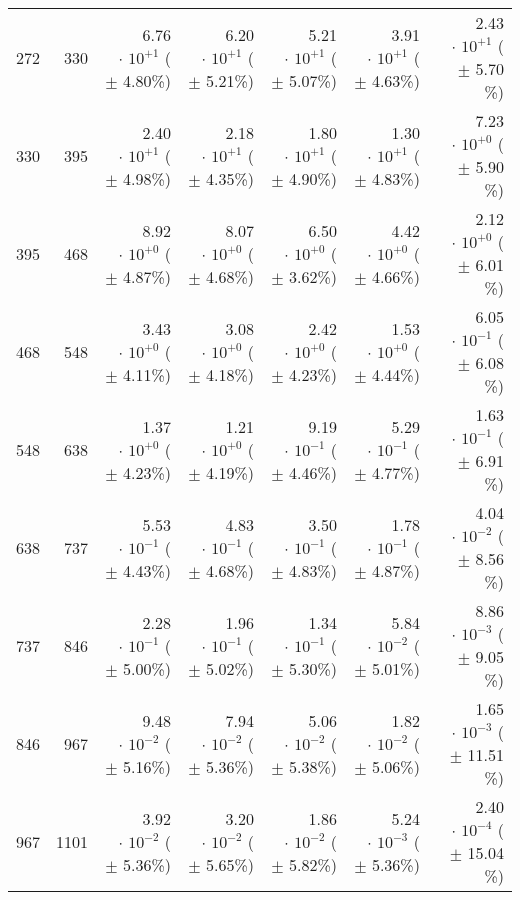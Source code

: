\begin{table}[h!]
\begin{center}
\begin{tabular}{|r|r|r|r|r|r|r|}
 272 &  330 & 6.76$\,\cdot\, 10^{+1}$  ($\pm\!\!$  4.80\%) & 6.20$\,\cdot\, 10^{+1}$  ($\pm\!\!$  5.21\%) & 5.21$\,\cdot\, 10^{+1}$  ($\pm\!\!$  5.07\%) & 3.91$\,\cdot\, 10^{+1}$  ($\pm\!\!$  4.63\%) & 2.43$\,\cdot\, 10^{+1}$  ($\pm\!\!$  5.70 \%)\\
 330 &  395 & 2.40$\,\cdot\, 10^{+1}$  ($\pm\!\!$  4.98\%) & 2.18$\,\cdot\, 10^{+1}$  ($\pm\!\!$  4.35\%) & 1.80$\,\cdot\, 10^{+1}$  ($\pm\!\!$  4.90\%) & 1.30$\,\cdot\, 10^{+1}$  ($\pm\!\!$  4.83\%) & 7.23$\,\cdot\, 10^{+0}$  ($\pm\!\!$  5.90 \%)\\
 395 &  468 & 8.92$\,\cdot\, 10^{+0}$  ($\pm\!\!$  4.87\%) & 8.07$\,\cdot\, 10^{+0}$  ($\pm\!\!$  4.68\%) & 6.50$\,\cdot\, 10^{+0}$  ($\pm\!\!$  3.62\%) & 4.42$\,\cdot\, 10^{+0}$  ($\pm\!\!$  4.66\%) & 2.12$\,\cdot\, 10^{+0}$  ($\pm\!\!$  6.01 \%)\\
 468 &  548 & 3.43$\,\cdot\, 10^{+0}$  ($\pm\!\!$  4.11\%) & 3.08$\,\cdot\, 10^{+0}$  ($\pm\!\!$  4.18\%) & 2.42$\,\cdot\, 10^{+0}$  ($\pm\!\!$  4.23\%) & 1.53$\,\cdot\, 10^{+0}$  ($\pm\!\!$  4.44\%) & 6.05$\,\cdot\, 10^{-1}$  ($\pm\!\!$  6.08 \%)\\
 548 &  638 & 1.37$\,\cdot\, 10^{+0}$  ($\pm\!\!$  4.23\%) & 1.21$\,\cdot\, 10^{+0}$  ($\pm\!\!$  4.19\%) & 9.19$\,\cdot\, 10^{-1}$  ($\pm\!\!$  4.46\%) & 5.29$\,\cdot\, 10^{-1}$  ($\pm\!\!$  4.77\%) & 1.63$\,\cdot\, 10^{-1}$  ($\pm\!\!$  6.91 \%)\\
 638 &  737 & 5.53$\,\cdot\, 10^{-1}$  ($\pm\!\!$  4.43\%) & 4.83$\,\cdot\, 10^{-1}$  ($\pm\!\!$  4.68\%) & 3.50$\,\cdot\, 10^{-1}$  ($\pm\!\!$  4.83\%) & 1.78$\,\cdot\, 10^{-1}$  ($\pm\!\!$  4.87\%) & 4.04$\,\cdot\, 10^{-2}$  ($\pm\!\!$  8.56 \%)\\
 737 &  846 & 2.28$\,\cdot\, 10^{-1}$  ($\pm\!\!$  5.00\%) & 1.96$\,\cdot\, 10^{-1}$  ($\pm\!\!$  5.02\%) & 1.34$\,\cdot\, 10^{-1}$  ($\pm\!\!$  5.30\%) & 5.84$\,\cdot\, 10^{-2}$  ($\pm\!\!$  5.01\%) & 8.86$\,\cdot\, 10^{-3}$  ($\pm\!\!$  9.05 \%)\\
 846 &  967 & 9.48$\,\cdot\, 10^{-2}$  ($\pm\!\!$  5.16\%) & 7.94$\,\cdot\, 10^{-2}$  ($\pm\!\!$  5.36\%) & 5.06$\,\cdot\, 10^{-2}$  ($\pm\!\!$  5.38\%) & 1.82$\,\cdot\, 10^{-2}$  ($\pm\!\!$  5.06\%) & 1.65$\,\cdot\, 10^{-3}$  ($\pm\!\!$ 11.51 \%)\\
 967 & 1101 & 3.92$\,\cdot\, 10^{-2}$  ($\pm\!\!$  5.36\%) & 3.20$\,\cdot\, 10^{-2}$  ($\pm\!\!$  5.65\%) & 1.86$\,\cdot\, 10^{-2}$  ($\pm\!\!$  5.82\%) & 5.24$\,\cdot\, 10^{-3}$  ($\pm\!\!$  5.36\%) & 2.40$\,\cdot\, 10^{-4}$  ($\pm\!\!$ 15.04 \%)\\

\end{tabular}
\end{center}
\end{table}
